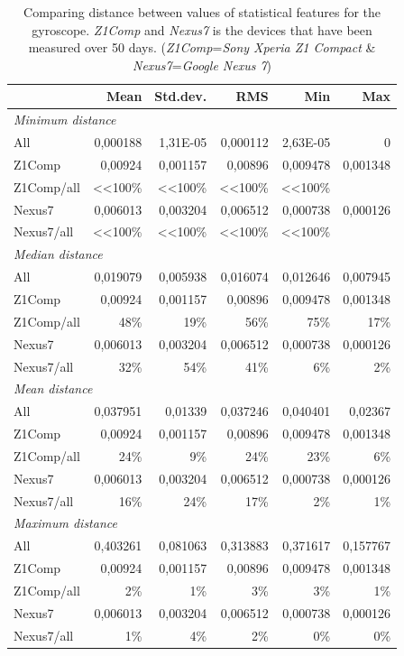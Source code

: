 \begin{table}[htbp]
  \centering
    \begin{tabular}{lrrrrr}
    \toprule
          & Mean  & Std.dev. & RMS   & Min   & Max \\
    \toprule
    \multicolumn{6}{l}{\textit{Minimum distance}} \\
    All   & 0,000188 & 1,31E-05 & 0,000112 & 2,63E-05 & 0 \\
    Z1Comp & 0,00924 & 0,001157 & 0,00896 & 0,009478 & 0,001348 \\
    Z1Comp/all & <<100\% & <<100\% & <<100\% & <<100\% &  \\
    Nexus7 & 0,006013 & 0,003204 & 0,006512 & 0,000738 & 0,000126 \\
    Nexus7/all & <<100\% & <<100\% & <<100\% & <<100\% &  \\
    \midrule
    \multicolumn{6}{l}{\textit{Median distance}} \\
    All   & 0,019079 & 0,005938 & 0,016074 & 0,012646 & 0,007945 \\
    Z1Comp & 0,00924 & 0,001157 & 0,00896 & 0,009478 & 0,001348 \\
    Z1Comp/all & 48\%  & 19\%  & 56\%  & 75\%  & 17\% \\
    Nexus7 & 0,006013 & 0,003204 & 0,006512 & 0,000738 & 0,000126 \\
    Nexus7/all & 32\%  & 54\%  & 41\%  & 6\%   & 2\% \\ \midrule
    \multicolumn{6}{l}{\textit{Mean distance}} \\
    All   & 0,037951 & 0,01339 & 0,037246 & 0,040401 & 0,02367 \\
    Z1Comp & 0,00924 & 0,001157 & 0,00896 & 0,009478 & 0,001348 \\
    Z1Comp/all & 24\%  & 9\%   & 24\%  & 23\%  & 6\% \\
    Nexus7 & 0,006013 & 0,003204 & 0,006512 & 0,000738 & 0,000126 \\
    Nexus7/all & 16\%  & 24\%  & 17\%  & 2\%   & 1\% \\ \midrule
    \multicolumn{6}{l}{\textit{Maximum distance}} \\
    All   & 0,403261 & 0,081063 & 0,313883 & 0,371617 & 0,157767 \\
    Z1Comp & 0,00924 & 0,001157 & 0,00896 & 0,009478 & 0,001348 \\
    Z1Comp/all & 2\%   & 1\%   & 3\%   & 3\%   & 1\% \\
    Nexus7 & 0,006013 & 0,003204 & 0,006512 & 0,000738 & 0,000126 \\
    Nexus7/all & 1\%   & 4\%   & 2\%   & 0\%   & 0\% \\
    \bottomrule
    \end{tabular}%
    \caption{Comparing distance between values of statistical features for the gyroscope. \textit{Z1Comp} and \textit{Nexus7} is the devices that have been measured over 50 days. (\textit{Z1Comp}=\textit{Sony Xperia Z1 Compact} \& \textit{Nexus7}=\textit{Google Nexus 7})}
  \label{tab:featureGyro}%
\end{table}%
